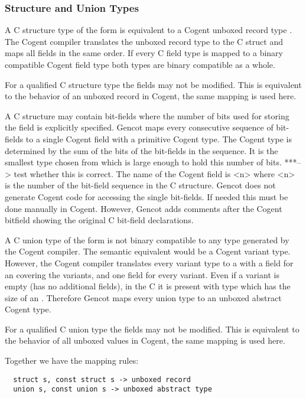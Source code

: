\subsubsection{Structure and Union Types}
\label{design-types-struct}

A C structure type of the form  is equivalent to a Cogent unboxed record type .
The Cogent compiler translates the unboxed record type to the C struct and maps all fields in the same order.
If every C field type is mapped to a binary compatible Cogent field type both types are binary compatible as a whole.

For a  qualified C structure type the fields may not be modified. This is equivalent to the behavior
of an unboxed record in Cogent, the same mapping is used here.

A C structure may contain bit-fields where the number of bits used for storing the field is explicitly specified.
Gencot maps every consecutive sequence of bit-fields to a single Cogent field with a primitive Cogent type.
The Cogent type is determined by the sum of the bits of the bit-fields in the sequence. It is the smallest 
type chosen from  which is large enough to hold this number of bits. 
***--> test whether this is correct.
The name of the
Cogent field is <n> where <n> is the number of the bit-field sequence in the C structure.
Gencot does not generate Cogent code for accessing the single bit-fields. If needed this must be done manually in Cogent.
However, Gencot adds comments after the Cogent bitfield showing the original C bit-field declarations.

A C union type of the form  is not binary compatible to any type generated by the Cogent compiler.
The semantic equivalent would be a Cogent variant type. However, the Cogent compiler translates every variant type
to a  with a field for an  covering the variants, and one field for every variant. Even if a variant
is empty (has no additional fields), in the C  it is present with type  which
has the size of an . Therefore Gencot maps every union type to an unboxed abstract Cogent type.

For a  qualified C union type the fields may not be modified. This is equivalent to the behavior
of all unboxed values in Cogent, the same mapping is used here.

Together we have the mapping rules:
\begin{verbatim}
  struct s, const struct s -> unboxed record
  union s, const union s -> unboxed abstract type
\end{verbatim}

